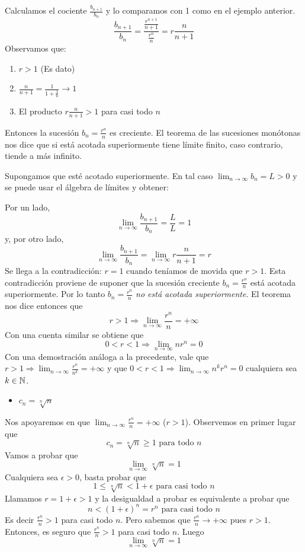 \documentclass[../Teoría.root.tex]{subfiles}
\begin{document}
Calculamos el cociente \(\frac{b_{n+1}}{b_n}\) y lo comparamos con 1 como en el ejemplo anterior.
\[\frac{b_{n+1}}{b_n}=\frac{\frac{r^{n+1}}{n+1}}{\frac{r^n}{n}}=r\frac{n}{n+1}\]
Observamos que:
\begin{enumerate}
    \item \(r>1\) (Es dato)
    \item \(\frac{n}{n+1}=\frac{1}{1+\frac{1}{n}}\rightarrow1\)
    \item El producto \(r\frac{n}{n+1}>1\) para casi todo \(n\)
\end{enumerate}
Entonces la sucesión \(b_n=\frac{r^n}{n}\) es creciente.
El teorema de las sucesiones monótonas nos dice que si está acotada superiormente tiene límite finito, caso contrario, tiende a más infinito.

Supongamos que esté acotado superiormente.
En tal caso \(\lim_{n\to\infty}b_n=L>0\) y se puede usar el álgebra de límites y obtener:

Por un lado, \[\lim_{n\to\infty}\frac{b_{n+1}}{b_n}=\frac{L}{L}=1\]
y, por otro lado, \[\lim_{n\to\infty}\frac{b_{n+1}}{b_n}=\lim_{n\to\infty}r\frac{n}{n+1}=r\]
Se llega a la contradicción: \(r=1\) cuando teníamos de movida que \(r>1\).
Esta contradicción proviene de suponer que la sucesión creciente \(b_n=\frac{r^n}{n}\) está acotada superiormente.
Por lo tanto \(b_n=\frac{r^n}{n}\) \textit{no está acotada superiormente}.
El teorema nos dice entonces que \[r>1\Rightarrow\lim_{n\to\infty}\frac{r^n}{n}=+\infty\]
Con una cuenta similar se obtiene que \[0<r<1\Rightarrow\lim_{n\to\infty}nr^n=0\]
Con una demostración análoga a la precedente, vale que
\(r>1\Rightarrow\lim_{n\to\infty}\frac{r^n}{n^k}=+\infty\) y que \(0<r<1\Rightarrow\lim_{n\to\infty}n^kr^n=0\) cualquiera sea \(k\in\mathbb{N}\).
\begin{itemize}
    \item \(c_n=\sqrt[n]{n}\)
\end{itemize}
Nos apoyaremos en que \(\lim_{n\to\infty}\frac{r^n}{n}=+\infty\) (\(r>1\)).
Observemos en primer lugar que \[c_n=\sqrt[n]{n}\geq1\text{ para todo }n\]
Vamos a probar que \[\lim_{n\to\infty}\sqrt[n]{n}=1\]
Cualquiera sea \(\epsilon>0\), basta probar que \[1\leq\sqrt[n]{n}<1+\epsilon\text{ para casi todo }n\]
Llamamos \(r=1+\epsilon>1\) y la desigualdad a probar es equivalente a probar que \[n<(1+\epsilon)^n=r^n\text{ para casi todo }n\]
Es decir \(\frac{r^n}{n}>1\) para casi todo \(n\).
Pero sabemos que \(\frac{r^n}{n}\rightarrow+\infty\) pues \(r>1\).
Entonces, es seguro que \(\frac{r^n}{n}>1\) para casi todo \(n\).
Luego \[\lim_{n\to\infty}\sqrt[n]{n}=1\]
\end{document}
